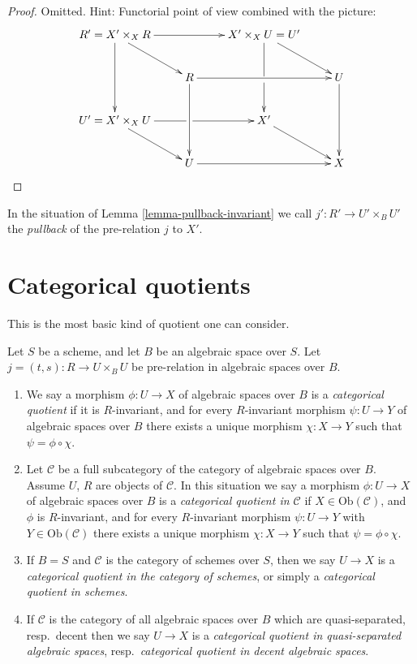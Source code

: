 \begin{proof}
Omitted. Hint: Functorial point of view combined with the picture:
$$
\xymatrix{
R' = X' \times_X R \ar[dd] \ar[rr] \ar[rd] &&
X' \times_X U = U' \ar'[d][dd] \ar[rd] \\
& R \ar[dd] \ar[rr] && U \ar[dd] \\
U' = X' \times_X U \ar'[r][rr] \ar[rd] && X' \ar[rd] \\
& U \ar[rr] && X
}
$$
\end{proof}

\begin{definition}
\label{definition-pullback}
In the situation of
Lemma \ref{lemma-pullback-invariant}
we call $j' : R' \to U' \times_B U'$ the {\it pullback} of the pre-relation
$j$ to $X'$.
\end{definition}





\section{Categorical quotients}
\label{section-categorical}

\noindent
This is the most basic kind of quotient one can consider.

\begin{definition}
\label{definition-categorical}
Let $S$ be a scheme, and let $B$ be an algebraic space over $S$.
Let $j = (t, s) : R \to U \times_B U$ be pre-relation in algebraic spaces
over $B$.
\begin{enumerate}
\item We say a morphism $\phi : U \to X$ of algebraic spaces over $B$
is a {\it categorical quotient} if it is $R$-invariant, and
for every $R$-invariant morphism $\psi : U \to Y$ of algebraic spaces over $B$
there exists a unique morphism $\chi : X \to Y$ such that
$\psi = \phi \circ \chi$.
\item Let $\mathcal{C}$ be a full subcategory of the category of algebraic
spaces over $B$. Assume $U$, $R$ are objects of $\mathcal{C}$.
In this situation we say
a morphism $\phi : U \to X$ of algebraic spaces over $B$
is a {\it categorical quotient in $\mathcal{C}$}
if $X \in \text{Ob}(\mathcal{C})$, and $\phi$ is $R$-invariant,
and for every $R$-invariant morphism
$\psi : U \to Y$ with $Y \in \text{Ob}(\mathcal{C})$
there exists a unique morphism $\chi : X \to Y$ such
that $\psi = \phi \circ \chi$.
\item If $B = S$ and $\mathcal{C}$ is the category of schemes over $S$,
then we say $U \to X$ is a
{\it categorical quotient in the category of schemes}, or simply a
{\it categorical quotient in schemes}.
\item If $\mathcal{C}$ is the category of all algebraic spaces over $B$
which are quasi-separated, resp.\ decent then we say $U \to X$ is a
{\it categorical quotient in quasi-separated algebraic spaces},
resp.\ {\it categorical quotient in decent algebraic spaces}.
\end{enumerate}
\end{definition}

